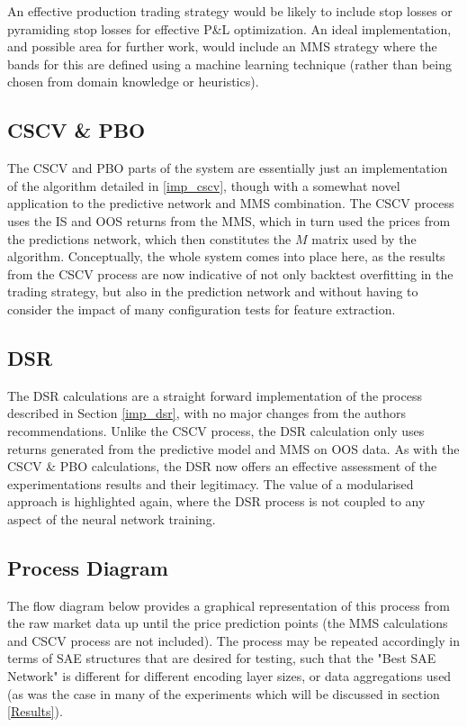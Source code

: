 \documentclass[a4paper,11pt,oneside]{article}
\theoremstyle{plain}
\theoremstyle{definition}
\begin{document}
	An effective production trading strategy would be likely to include stop losses or pyramiding stop losses for effective P\&L optimization. An ideal implementation, and possible area for further work, would include an MMS strategy where the bands for this are defined using a machine learning technique (rather than being chosen from domain knowledge or heuristics).\newline
	
	
	\subsection{CSCV \& PBO}\label{proc_cscv}
	
	The CSCV and PBO parts of the system are essentially just an implementation of the algorithm detailed in \ref{imp_cscv}, though with a somewhat novel application to the predictive network and MMS combination. The CSCV process uses the IS and OOS returns from the MMS, which in turn used the prices from the predictions network, which then constitutes the $M$ matrix used by the algorithm. Conceptually, the whole system comes into place here, as the results from the CSCV process are now indicative of not only backtest overfitting in the trading strategy, but also in the prediction network and without having to consider the impact of many configuration tests for feature extraction.
	
	\subsection{DSR}\label{proc_dsr}
	
	The DSR calculations are a straight forward implementation of the process described in Section \ref{imp_dsr}, with no major changes from the authors recommendations. Unlike the CSCV process, the DSR calculation only uses returns generated from the predictive model and MMS on OOS data. As with the CSCV \& PBO calculations, the DSR now offers an effective assessment of the experimentations results and their legitimacy. The value of a modularised approach is highlighted again, where the DSR process is not coupled to any aspect of the neural network training.
	
	\subsection{Process Diagram}\label{proc_diagram}
	
	The flow diagram below provides a graphical representation of this process from the raw market data up until the price prediction points (the MMS calculations and CSCV process are not included). The process may be repeated accordingly in terms of SAE structures that are desired for testing, such that the "Best SAE Network" is different for different encoding layer sizes, or data aggregations used (as was the case in many of the experiments which will be discussed in section \ref{Results}).
	
\end{document}
